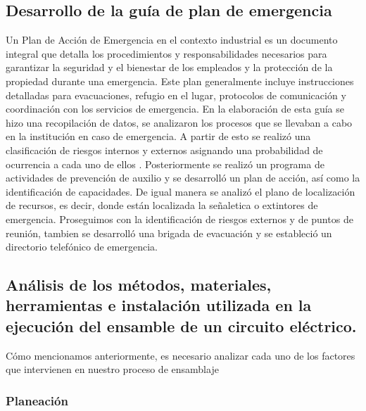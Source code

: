 \begin{itemize}
    \subsection{Desarrollo de la guía de plan de emergencia} Un Plan de Acción de Emergencia en el contexto industrial es un documento integral que detalla los procedimientos y responsabilidades necesarios para garantizar la seguridad y el bienestar de los empleados y la protección de la propiedad durante una emergencia. Este plan generalmente incluye instrucciones detalladas para evacuaciones, refugio en el lugar, protocolos de comunicación y coordinación con los servicios de emergencia.
    En la elaboración de esta guía se hizo una recopilación de datos,
    se analizaron los procesos que se llevaban a cabo en la institución en caso de emergencia. A partir de esto se realizó una clasificación de riesgos internos y externos asignando una probabilidad de ocurrencia a cada uno de ellos . Posteriormente se realizó un programa de actividades de prevención de auxilio y se desarrolló un plan de acción, así como la identificación de capacidades. De igual manera se analizó el plano de localización de recursos, es decir, donde están localizada la señaletica o extintores de emergencia.
    Proseguimos con la identificación de riesgos externos y de puntos de reunión, tambien se desarrolló una brigada de evacuación y se estableció un directorio telefónico de emergencia.
    \subsection{Análisis de los métodos, materiales, herramientas e instalación utilizada en la ejecución del ensamble de un circuito eléctrico.}

    Cómo mencionamos anteriormente, es necesario analizar cada uno de los factores que intervienen en nuestro proceso de ensamblaje 

    \subsubsection{Planeación}
    

\end{itemize}
